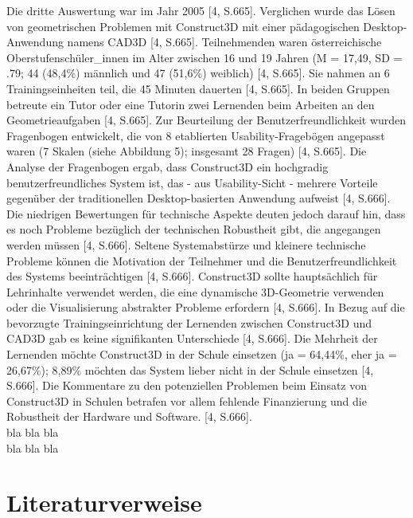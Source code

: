 \documentclass[deutsch]{llncs}
\begin{document}
\noindent 
Die dritte Auswertung war im Jahr 2005 [4, S.665]. Verglichen wurde das Lösen von geometrischen Problemen mit Construct3D mit einer pädagogischen Desktop-Anwendung namens CAD3D [4, S.665]. Teilnehmenden waren österreichische Oberstufenschüler\_innen im Alter zwischen 16 und 19 Jahren (M = 17,49, SD = .79; 44 (48,4\%) männlich und 47 (51,6\%) weiblich) [4, S.665]. Sie nahmen an 6 Trainingseinheiten teil, die 45 Minuten dauerten [4, S.665]. In beiden Gruppen betreute ein Tutor oder eine Tutorin zwei Lernenden beim Arbeiten an den Geometrieaufgaben [4, S.665]. Zur Beurteilung der Benutzerfreundlichkeit wurden Fragenbogen entwickelt, die von 8 etablierten Usability-Fragebögen angepasst waren (7 Skalen (siehe Abbildung 5); insgesamt 28 Fragen) [4, S.665].
Die Analyse der Fragenbogen ergab, dass Construct3D ein hochgradig benutzerfreundliches System ist, das - aus Usability-Sicht - mehrere Vorteile gegenüber der traditionellen Desktop-basierten Anwendung aufweist [4, S.666]. Die niedrigen Bewertungen für technische Aspekte deuten jedoch darauf hin, dass es noch Probleme bezüglich der technischen Robustheit gibt, die angegangen werden müssen [4, S.666]. Seltene Systemabstürze und kleinere technische Probleme können die Motivation der Teilnehmer und die Benutzerfreundlichkeit des Systems beeinträchtigen [4, S.666]. Construct3D sollte hauptsächlich für Lehrinhalte verwendet werden, die eine dynamische 3D-Geometrie verwenden oder die Visualisierung abstrakter Probleme erfordern [4, S.666]. In Bezug auf die bevorzugte Trainingseinrichtung der Lernenden zwischen Construct3D und CAD3D gab es keine signifikanten Unterschiede [4, S.666]. Die Mehrheit der Lernenden möchte Construct3D in der Schule einsetzen (ja = 64,44\%, eher ja = 26,67\%); 8,89\% möchten das System lieber nicht in der Schule einsetzen [4, S.666].  Die Kommentare zu den potenziellen Problemen beim Einsatz von Construct3D in Schulen betrafen vor allem fehlende Finanzierung und die Robustheit der Hardware und Software\cite{Kaufmann_summaryof}. [4, S.666]. \\
\cite{article}
bla bla bla \\
\cite{Kaufmann:2002:MGE:1242073.1242086}
bla bla bla \\
\cite{Kaufmann_summaryof}
\cite{Klampfer}

\section{Literaturverweise}
\label{sec:bib}
\end{document}
